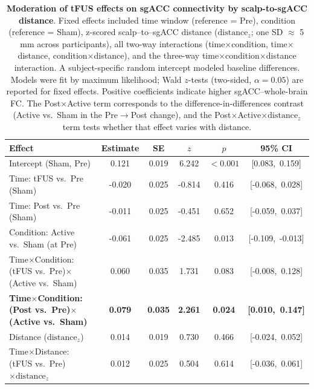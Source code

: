 \begin{table}[t]
    \centering
    \caption{\textbf{Moderation of tFUS effects on sgACC connectivity by scalp-to-sgACC distance}. 
Fixed effects included time window (reference = Pre), condition (reference = Sham), z-scored scalp–to–sgACC distance ($\mathrm{distance}_z$; one SD $\approx$ 5\,mm across participants), all two-way interactions (time$\times$condition, time$\times$distance, condition$\times$distance), and the three-way time$\times$condition$\times$distance interaction. A subject-specific random intercept modeled baseline differences. Models were fit by maximum likelihood; Wald $z$-tests (two-sided, $\alpha=0.05$) are reported for fixed effects. Positive coefficients indicate higher sgACC–whole-brain FC. The Post$\times$Active term corresponds to the difference-in-differences contrast (Active vs.\ Sham in the Pre$\rightarrow$Post change), and the Post$\times$Active$\times\mathrm{distance}_z$ term tests whether that effect varies with distance.}
    \label{tab:distance_moderation_mixedlm}
    \setlength{\tabcolsep}{8pt}
    \begin{tabular}{lccccc}
    \toprule
    \textbf{Effect} & \textbf{Estimate} & \textbf{SE} & \textbf{$z$} & \textbf{$p$} & \textbf{95\% CI} \\
    \midrule
    Intercept (Sham, Pre)                                             & 0.121 & 0.019 &  6.242 & $<\!0.001$ & [0.083,\ 0.159] \\
    Time: tFUS vs.\ Pre (Sham)                                       &-0.020 & 0.025 & -0.814 & 0.416      & [-0.068,\ 0.028] \\
    Time: Post vs.\ Pre (Sham)                                       &-0.011 & 0.025 & -0.451 & 0.652      & [-0.059,\ 0.037] \\
    Condition: Active vs.\ Sham (at Pre)                             &-0.061 & 0.025 & -2.485 & 0.013      & [-0.109,\ -0.013] \\
    Time$\times$Condition: (tFUS vs.\ Pre)$\times$(Active vs.\ Sham) & 0.060 & 0.035 &  1.731 & 0.083      & [-0.008,\ 0.128] \\
    \textbf{Time$\times$Condition: (Post vs.\ Pre)$\times$(Active vs.\ Sham)} & \textbf{0.079} & \textbf{0.035} &  \textbf{2.261} & \textbf{0.024}      & \textbf{[0.010,\ 0.147]} \\
    \addlinespace[3pt]
    Distance ($\mathrm{distance}_z$)                                  & 0.014 & 0.019 &  0.730 & 0.466      & [-0.024,\ 0.052] \\
    Time$\times$Distance: (tFUS vs.\ Pre)$\times \mathrm{distance}_z$ & 0.012 & 0.025 &  0.504 & 0.614      & [-0.036,\ 0.061] \\

\end{tabular}
\end{table}

